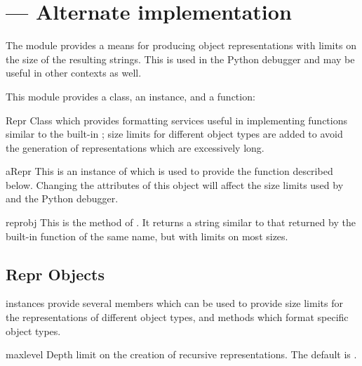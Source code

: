 \section{ ---
         Alternate  implementation}



The  module provides a means for producing object
representations with limits on the size of the resulting strings.
This is used in the Python debugger and may be useful in other
contexts as well.

This module provides a class, an instance, and a function:


\begin{classdesc}{Repr}{}
  Class which provides formatting services useful in implementing
  functions similar to the built-in ; size limits for 
  different object types are added to avoid the generation of
  representations which are excessively long.
\end{classdesc}


\begin{datadesc}{aRepr}
  This is an instance of  which is used to provide the
   function described below.  Changing the attributes
  of this object will affect the size limits used by 
  and the Python debugger.
\end{datadesc}


\begin{funcdesc}{repr}{obj}
  This is the  method of .  It returns a
  string similar to that returned by the built-in function of the same 
  name, but with limits on most sizes.
\end{funcdesc}


\subsection{Repr Objects \label{Repr-objects}}

 instances provide several members which can be used to
provide size limits for the representations of different object types, 
and methods which format specific object types.


\begin{memberdesc}[Repr]{maxlevel}
  Depth limit on the creation of recursive representations.  The
  default is .
\end{memberdesc}

